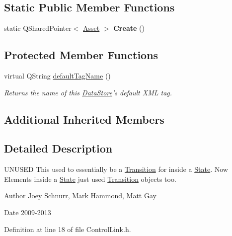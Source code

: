 \subsection*{Static Public Member Functions}
\begin{DoxyCompactItemize}
\item 
\hypertarget{class_picto_1_1_control_link_aac7c99703b61eebf811962ac2a40ad4d}{static Q\-Shared\-Pointer$<$ \hyperlink{class_picto_1_1_asset}{Asset} $>$ {\bfseries Create} ()}\label{class_picto_1_1_control_link_aac7c99703b61eebf811962ac2a40ad4d}

\end{DoxyCompactItemize}
\subsection*{Protected Member Functions}
\begin{DoxyCompactItemize}
\item 
virtual Q\-String \hyperlink{class_picto_1_1_control_link_a1565a71cfa7de5d4265cefb9c77ebb2f}{default\-Tag\-Name} ()
\begin{DoxyCompactList}\small\item\em Returns the name of this \hyperlink{class_picto_1_1_data_store}{Data\-Store}'s default X\-M\-L tag. \end{DoxyCompactList}\end{DoxyCompactItemize}
\subsection*{Additional Inherited Members}


\subsection{Detailed Description}
U\-N\-U\-S\-E\-D This used to essentially be a \hyperlink{class_picto_1_1_transition}{Transition} for inside a \hyperlink{class_picto_1_1_state}{State}. Now Elements inside a \hyperlink{class_picto_1_1_state}{State} just used \hyperlink{class_picto_1_1_transition}{Transition} objects too. \begin{DoxyAuthor}{Author}
Joey Schnurr, Mark Hammond, Matt Gay 
\end{DoxyAuthor}
\begin{DoxyDate}{Date}
2009-\/2013 
\end{DoxyDate}


Definition at line 18 of file Control\-Link.\-h.



